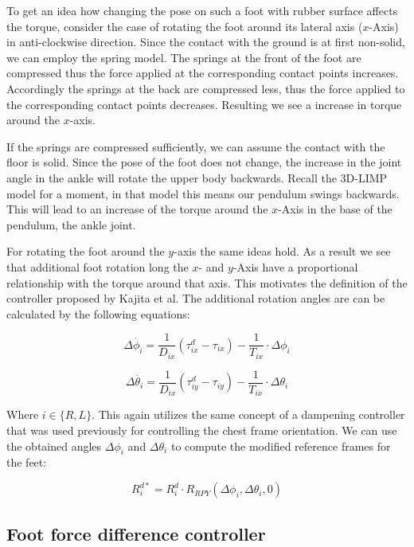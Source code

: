 \documentclass[english,ngerman]{KITreprt}
\begin{document}
To get an idea how changing the pose on such a foot with rubber surface
affects the torque, consider the case of rotating the foot around its
lateral axis ($x$-Axis) in anti-clockwise direction. Since the contact
with the ground is at first non-solid, we can employ the spring model.
The springs at the front of the foot are compressed thus the force
applied at the corresponding contact points increases. Accordingly the
springs at the back are compressed less, thus the force applied to the
corresponding contact points decreases. Resulting we see a increase in
torque around the $x$-axis.

If the springs are compressed sufficiently, we can assume the contact
with the floor is solid. Since the pose of the foot does not change, the
increase in the joint angle in the ankle will rotate the upper body
backwards. Recall the 3D-LIMP model for a moment, in that model this
means our pendulum swings backwards. This will lead to an increase of
the torque around the $x$-Axis in the base of the pendulum, the ankle
joint.

For rotating the foot around the $y$-axis the same ideas hold. As a
result we see that additional foot rotation long the $x$- and $y$-Axis
have a proportional relationship with the torque around that axis. This
motivates the definition of the controller proposed by Kajita et al. The
additional rotation angles are can be calculated by the following
equations:

\begin{equation}
\Delta \dot{\phi_i} = \frac{1}{D_{ix}} (\tau^d_{ix} - \tau_{ix}) - \frac{1}{T_{ix}} \cdot \Delta \phi_i
\end{equation}

\begin{equation}
\Delta \dot{\theta_i} = \frac{1}{D_{ix}} (\tau^d_{iy} - \tau_{iy}) - \frac{1}{T_{ix}} \cdot \Delta \theta_i
\end{equation}

Where $i \in \{R, L\}$. This again utilizes the same concept of a
dampening controller that was used previously for controlling the chest
frame orientation. We can use the obtained angles $\Delta \phi_i$ and
$\Delta \theta_i$ to compute the modified reference frames for the feet:

\begin{equation}
R^{d*}_i = R^d_i \cdot R_{RPY}(\Delta \phi_i, \Delta \theta_i, 0)
\end{equation}

\subsection{Foot force difference
controller}\label{foot-force-difference-controller}
\end{document}
